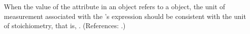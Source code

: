 When the value of the attribute  in an \InitialAssignment
object refers to a \SpeciesReference object, the unit of measurement
associated with the \InitialAssignment's  expression should be
consistent with the unit of stoichiometry, that is, .
(References: .)
